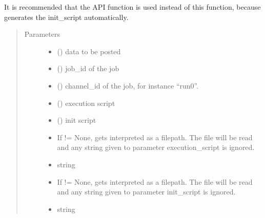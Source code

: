 \documentclass[letterpaper,10pt,english,openany,oneside]{sphinxmanual}
\begin{document}
\begin{fulllineitems}
\begin{fulllineitems}
It is recommended that the API function  is used instead of this function, because  generates the init\_script automatically.
\begin{quote}\begin{description}
\item[{Parameters}] \leavevmode\begin{itemize}
\item {} 
 () \textendash{} data to be posted

\item {} 
 () \textendash{} job\_id of the job

\item {} 
 () \textendash{} channel\_id of the job, for instance “run0”.

\item {} 
 () \textendash{} execution script

\item {} 
 () \textendash{} init script

\item {} 
 \textendash{} If != None, gets interpreted as a filepath. The file will be read and any string given to parameter execution\_script is ignored.

\item {} 
 \textendash{} string

\item {} 
 \textendash{} If != None, gets interpreted as a filepath. The file will be read and any string given to parameter init\_script is ignored.

\item {} 
 \textendash{} string

\end{itemize}


\end{description}
\end{quote}
\end{fulllineitems}
\end{fulllineitems}
\end{document}
